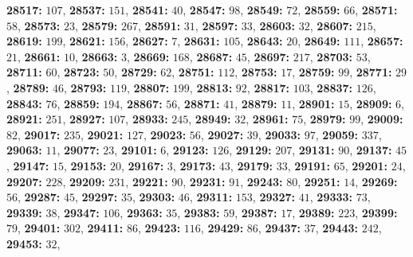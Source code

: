 \textsf{\bfseries 28517:} $107$, \textsf{\bfseries 28537:} $151$, \textsf{\bfseries 28541:} $40$, \textsf{\bfseries 28547:} $98$, \textsf{\bfseries 28549:} $72$, \textsf{\bfseries 28559:} $66$, \textsf{\bfseries 28571:} $58$, \textsf{\bfseries 28573:} $23$, \textsf{\bfseries 28579:} $267$, \textsf{\bfseries 28591:} $31$, \textsf{\bfseries 28597:} $33$, \textsf{\bfseries 28603:} $32$, \textsf{\bfseries 28607:} $215$, \textsf{\bfseries 28619:} $199$, \textsf{\bfseries 28621:} $156$, \textsf{\bfseries 28627:} $7$, \textsf{\bfseries 28631:} $105$, \textsf{\bfseries 28643:} $20$, \textsf{\bfseries 28649:} $111$, \textsf{\bfseries 28657:} $21$, \textsf{\bfseries 28661:} $10$, \textsf{\bfseries 28663:} $3$, \textsf{\bfseries 28669:} $168$, \textsf{\bfseries 28687:} $45$, \textsf{\bfseries 28697:} $217$, \textsf{\bfseries 28703:} $53$, \textsf{\bfseries 28711:} $60$, \textsf{\bfseries 28723:} $50$, \textsf{\bfseries 28729:} $62$, \textsf{\bfseries 28751:} $112$, \textsf{\bfseries 28753:} $17$, \textsf{\bfseries 28759:} $99$, \textsf{\bfseries 28771:} $29$, \textsf{\bfseries 28789:} $46$, \textsf{\bfseries 28793:} $119$, \textsf{\bfseries 28807:} $199$, \textsf{\bfseries 28813:} $92$, \textsf{\bfseries 28817:} $103$, \textsf{\bfseries 28837:} $126$, \textsf{\bfseries 28843:} $76$, \textsf{\bfseries 28859:} $194$, \textsf{\bfseries 28867:} $56$, \textsf{\bfseries 28871:} $41$, \textsf{\bfseries 28879:} $11$, \textsf{\bfseries 28901:} $15$, \textsf{\bfseries 28909:} $6$, \textsf{\bfseries 28921:} $251$, \textsf{\bfseries 28927:} $107$, \textsf{\bfseries 28933:} $245$, \textsf{\bfseries 28949:} $32$, \textsf{\bfseries 28961:} $75$, \textsf{\bfseries 28979:} $99$, \textsf{\bfseries 29009:} $82$, \textsf{\bfseries 29017:} $235$, \textsf{\bfseries 29021:} $127$, \textsf{\bfseries 29023:} $56$, \textsf{\bfseries 29027:} $39$, \textsf{\bfseries 29033:} $97$, \textsf{\bfseries 29059:} $337$, \textsf{\bfseries 29063:} $11$, \textsf{\bfseries 29077:} $23$, \textsf{\bfseries 29101:} $6$, \textsf{\bfseries 29123:} $126$, \textsf{\bfseries 29129:} $207$, \textsf{\bfseries 29131:} $90$, \textsf{\bfseries 29137:} $45$, \textsf{\bfseries 29147:} $15$, \textsf{\bfseries 29153:} $20$, \textsf{\bfseries 29167:} $3$, \textsf{\bfseries 29173:} $43$, \textsf{\bfseries 29179:} $33$, \textsf{\bfseries 29191:} $65$, \textsf{\bfseries 29201:} $24$, \textsf{\bfseries 29207:} $228$, \textsf{\bfseries 29209:} $231$, \textsf{\bfseries 29221:} $90$, \textsf{\bfseries 29231:} $91$, \textsf{\bfseries 29243:} $80$, \textsf{\bfseries 29251:} $14$, \textsf{\bfseries 29269:} $56$, \textsf{\bfseries 29287:} $45$, \textsf{\bfseries 29297:} $35$, \textsf{\bfseries 29303:} $46$, \textsf{\bfseries 29311:} $153$, \textsf{\bfseries 29327:} $41$, \textsf{\bfseries 29333:} $73$, \textsf{\bfseries 29339:} $38$, \textsf{\bfseries 29347:} $106$, \textsf{\bfseries 29363:} $35$, \textsf{\bfseries 29383:} $59$, \textsf{\bfseries 29387:} $17$, \textsf{\bfseries 29389:} $223$, \textsf{\bfseries 29399:} $79$, \textsf{\bfseries 29401:} $302$, \textsf{\bfseries 29411:} $86$, \textsf{\bfseries 29423:} $116$, \textsf{\bfseries 29429:} $86$, \textsf{\bfseries 29437:} $37$, \textsf{\bfseries 29443:} $242$, \textsf{\bfseries 29453:} $32$, 
